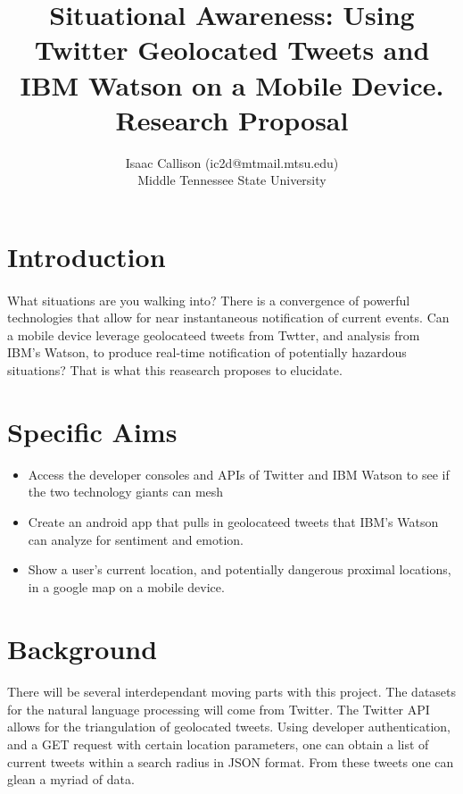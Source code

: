 \documentclass[12pt, oneside]{article}
\title{Situational Awareness: Using Twitter Geolocated Tweets and IBM Watson on a Mobile Device.
\\\medskip Research Proposal}
\author{Isaac Callison (ic2d@mtmail.mtsu.edu)\\Middle Tennessee State University}
\begin{document}
\maketitle
\nocite{*}
\newpage{}

\section{Introduction}
\paragraph{}
What situations are you walking into? There is a convergence of powerful
technologies that allow for near instantaneous notification of current events.
Can a mobile device leverage geolocateed tweets from Twtter, and analysis from
IBM's Watson, to produce real-time notification of potentially hazardous
situations? That is what this reasearch proposes to elucidate.

\section{Specific Aims}
\begin{itemize}
 \item Access the developer consoles and APIs of Twitter and IBM Watson to see
 if the two technology giants can mesh

 \item Create an android app that pulls in geolocateed tweets that IBM's Watson
 can analyze for sentiment and emotion.

 \item Show a user's current location, and potentially dangerous proximal
 locations, in a google map on a mobile device.

\end{itemize}

\section{Background}
\paragraph{}
There will be several interdependant moving parts with this project. The datasets for the natural language processing will come from Twitter. The
Twitter API allows for the triangulation of geolocated tweets\cite{TwitterGeo}.
Using developer authentication, and a GET request with certain location parameters, one can obtain a list of current tweets within a search radius in JSON format. From these tweets one can glean a myriad of data.
\end{document}
